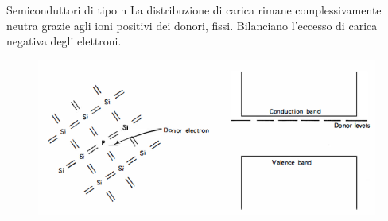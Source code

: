 \documentclass{beamer}
\begin{document}

\begin{frame}{Semiconduttori di tipo n}
 La distribuzione di carica rimane complessivamente neutra grazie agli ioni positivi dei donori, fissi. Bilanciano l'eccesso di carica negativa degli elettroni.
          \begin{figure}
\includegraphics[width=\textwidth]{images/drogaggion.PNG}
\end{figure}  
\end{frame}
\end{document}
